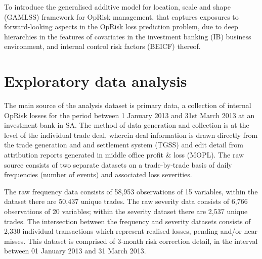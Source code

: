 \documentclass[]{article}
\begin{document}
To introduce the generalised additive model for location, scale and
shape (GAMLSS) framework for OpRisk management, that captures exposures
to forward-looking aspects in the OpRisk loss prediction problem, due to
deep hierarchies in the features of covariates in the investment banking
(IB) business environment, and internal control risk factors (BEICF)
thereof.

\section{Exploratory data analysis}
\label{sec:Exploratory data analysis}

The main source of the analysis dataset is primary data, a collection of
internal OpRisk losses for the period between 1 January 2013 and 31st
March 2013 at an investment bank in SA. The method of data generation
and collection is at the level of the individual trade deal, wherein
deal information is drawn directly from the trade generation and and
settlement system (TGSS) and edit detail from attribution reports
generated in middle office profit \& loss (MOPL). The raw source
consists of two separate datasets on a trade-by-trade basis of daily
frequencies (number of events) and associated loss severities.\medskip

The raw frequency data consists of 58,953 observations of 15 variables,
within the dataset there are 50,437 unique trades. The raw severity data
consists of 6,766 observations of 20 variables; within the severity
dataset there are 2,537 unique trades. The intersection between the
frequency and severity datasets consists of 2,330 individual
transactions which represent realised losses, pending and/or near
misses. This dataset is comprised of 3-month risk correction detail, in
the interval between 01 January 2013 and 31 March 2013. \medskip
\end{document}
